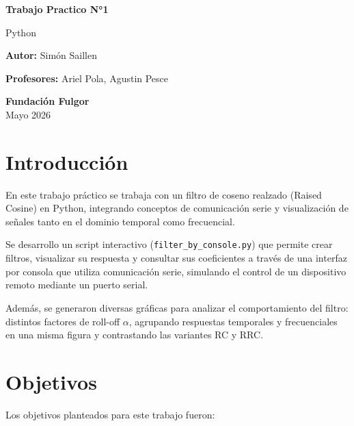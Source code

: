 \documentclass[11pt,a4paper]{article}
\begin{document}
\begin{titlepage}
    \begin{center}
        \vspace*{1cm}

        \Huge
        \textbf{Trabajo Practico N°1}

        \vspace{0.5cm}
        \LARGE
        Python

        \vspace{1.5cm}

        \vfill

        \Large
        \textbf{Autor:} Simón Saillen

        \Large
        \textbf{Profesores:} Ariel Pola, Agustin Pesce

        \vspace{0.5cm}

        \Large
        \textbf{Fundación Fulgor}\\
        Mayo 2026

    \end{center}
\end{titlepage}
\newpage

\section{Introducción}

En este trabajo práctico se trabaja con un filtro de coseno realzado (Raised
Cosine) en Python, integrando conceptos de comunicación serie y visualización
de señales tanto en el dominio temporal como frecuencial.

Se desarrollo un script interactivo (\texttt{filter\_by\_console.py}) que
permite crear filtros, visualizar su respuesta y consultar sus coeficientes a
través de una interfaz por consola que utiliza comunicación serie, simulando el
control de un dispositivo remoto mediante un puerto serial.

Además, se generaron diversas gráficas para analizar el comportamiento del
filtro: distintos factores de roll-off $\alpha$, agrupando respuestas
temporales y frecuenciales en una misma figura y contrastando las variantes RC
y RRC.\@

\section{Objetivos}

Los objetivos planteados para este trabajo fueron:
\end{document}

